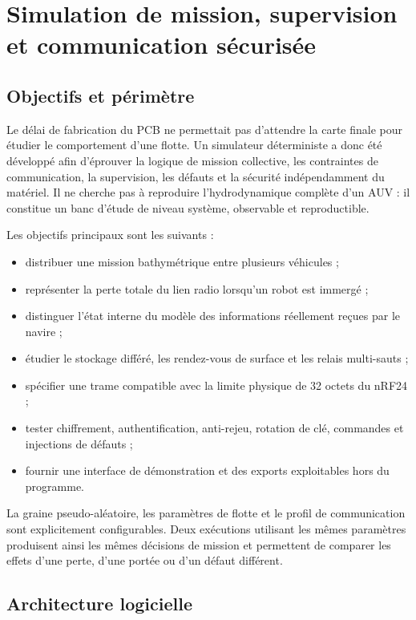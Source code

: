 \chapter{Simulation de mission, supervision et communication sécurisée}
\label{chap:communication}

\section{Objectifs et périmètre}

Le délai de fabrication du PCB ne permettait pas d'attendre la carte finale pour étudier le comportement d'une flotte. Un simulateur déterministe a donc été développé afin d'éprouver la logique de mission collective, les contraintes de communication, la supervision, les défauts et la sécurité indépendamment du matériel. Il ne cherche pas à reproduire l'hydrodynamique complète d'un AUV : il constitue un banc d'étude de niveau système, observable et reproductible.

Les objectifs principaux sont les suivants :

\begin{itemize}
  \item distribuer une mission bathymétrique entre plusieurs véhicules ;
  \item représenter la perte totale du lien radio lorsqu'un robot est immergé ;
  \item distinguer l'état interne du modèle des informations réellement reçues par le navire ;
  \item étudier le stockage différé, les rendez-vous de surface et les relais multi-sauts ;
  \item spécifier une trame compatible avec la limite physique de 32 octets du nRF24 ;
  \item tester chiffrement, authentification, anti-rejeu, rotation de clé, commandes et injections de défauts ;
  \item fournir une interface de démonstration et des exports exploitables hors du programme.
\end{itemize}

La graine pseudo-aléatoire, les paramètres de flotte et le profil de communication sont explicitement configurables. Deux exécutions utilisant les mêmes paramètres produisent ainsi les mêmes décisions de mission et permettent de comparer les effets d'une perte, d'une portée ou d'un défaut différent.

\section{Architecture logicielle}

